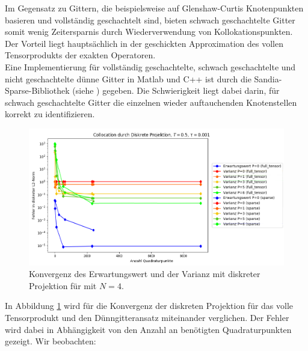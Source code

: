 Im Gegensatz zu Gittern, die beispielsweise auf Glenshaw-Curtis Knotenpunkten basieren und vollständig geschachtelt sind, bieten schwach geschachtelte Gitter somit wenig Zeitersparnis durch Wiederverwendung von Kollokationspunkten. Der Vorteil liegt hauptsächlich in der geschickten Approximation des vollen Tensorprodukts der exakten Operatoren.\\
Eine Implementierung für vollständig geschachtelte, schwach geschachtelte und nicht geschachtelte dünne Gitter in Matlab und C++ ist durch die Sandia-Sparse-Bibliothek (siehe \autocite{Sandia}) gegeben. Die Schwierigkeit liegt dabei darin, für schwach geschachtelte Gitter die einzelnen wieder auftauchenden Knotenstellen korrekt zu identifizieren.
\begin{figure}[!htb]
\includegraphics[width=\textwidth]{Figures/collocation_dp_trial8_nebeneinander.png}
\caption{Konvergenz des Erwartungswert und der Varianz mit diskreter Projektion für  mit $N=4$.}
\label{fig:dp_trial8}
\end{figure}
In Abbildung \ref{fig:dp_trial8} wird für  die Konvergenz der diskreten Projektion für das volle Tensorprodukt und den Dünngitteransatz miteinander verglichen. Der Fehler wird dabei in Abhängigkeit von den Anzahl an benötigten Quadraturpunkten gezeigt. Wir beobachten:
